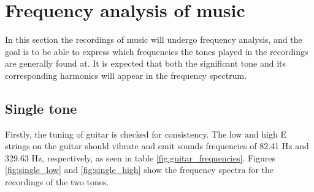 \section{Frequency analysis of music}
In this section the recordings of music will undergo frequency analysis, and the goal is to be able to express which frequencies the tones played in the recordings are generally found at. It is expected that both the significant tone and its corresponding harmonics will appear in the frequency spectrum.     
\subsection{Single tone}\label{sec:single}
Firstly, the tuning of guitar is checked for consistency. The low and high E strings on the guitar should vibrate and emit sounds frequencies of 82.41 Hz and 329.63 Hz, respectively, as seen in table \ref{fig:guitar_frequencies}. Figures \ref{fig:single_low} and \ref{fig:single_high} show the frequency spectra for the recordings of the two tones.
